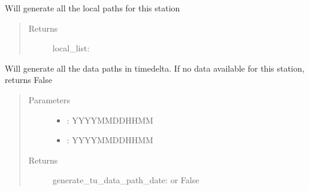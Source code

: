 \documentclass[letterpaper,10pt,english]{sphinxmanual}
\begin{document}
\begin{fulllineitems}
\begin{fulllineitems}
\label{\detokenize{DwdDataPrep:DwdDataPrep.Station.generate_tu_data_path}}
\sphinxAtStartPar
{} Will generate all the local paths for this station
\begin{quote}\begin{description}
\item[{Returns}] \leavevmode
\sphinxAtStartPar
local\_list: 

\end{description}\end{quote}

\end{fulllineitems}


\begin{fulllineitems}
\label{\detokenize{DwdDataPrep:DwdDataPrep.Station.generate_tu_data_path_date}}
\sphinxAtStartPar
{} Will generate all the data paths in timedelta. If no data available for this station, returns False
\begin{quote}\begin{description}
\item[{Parameters}] \leavevmode\begin{itemize}
\item {} 
\sphinxAtStartPar
{} \textendash{} : YYYYMMDDHHMM

\item {} 
\sphinxAtStartPar
{} \textendash{} : YYYYMMDDHHMM

\end{itemize}

\item[{Returns}] \leavevmode
\sphinxAtStartPar
generate\_tu\_data\_path\_date:  or False

\end{description}\end{quote}


\end{fulllineitems}
\end{fulllineitems}
\end{document}
